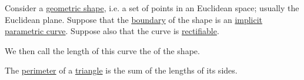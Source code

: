 \begin{definition}\label{def:perimeter}
  Consider a \hyperref[rem:geometric_shape]{geometric shape}, i.e. a set of points in an Euclidean space; usually the Euclidean plane. Suppose that the \hyperref[def:topological_boundary]{boundary} of the shape is an \hyperref[def:parametric_curve]{implicit parametric curve}. Suppose also that the curve is \hyperref[def:parametric_curve_length]{rectifiable}.

  We then call the length of this curve the  of the shape.
\end{definition}

\begin{proposition}\label{thm:perimeter_of_triangle}
  The \hyperref[def:perimeter]{perimeter} of a \hyperref[def:triangle]{triangle} is the sum of the lengths of its sides.
\end{proposition}
